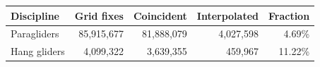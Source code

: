 \begin{tabular}{lrrrr}
\toprule
Discipline & Grid fixes & Coincident & Interpolated & Fraction\\
\midrule
Paragliders & 85,915,677 & 81,888,079 & 4,027,598 & 4.69\%\\
Hang gliders & 4,099,322 & 3,639,355 & 459,967 & 11.22\%\\
\bottomrule
\end{tabular}
